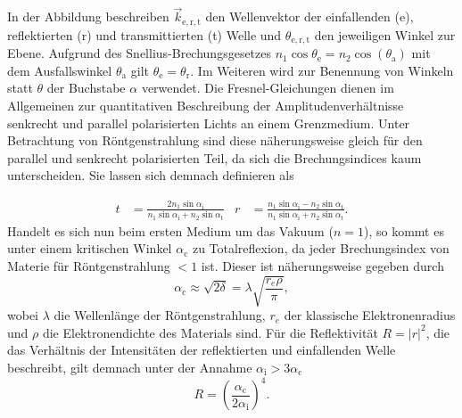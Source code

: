 In der Abbildung beschreiben $\vec{k}_\mathrm{e,r,t}$ den Wellenvektor der einfallenden (e), reflektierten (r) und transmittierten (t) Welle und $\theta_\mathrm{e,r,t}$ den jeweiligen Winkel zur Ebene.
Aufgrund des Snellius-Brechungsgesetzes $n_1 \cos {\theta_\mathrm{e}} = n_2 \cos (\theta_\mathrm{a}) $ mit dem Ausfallswinkel $\theta_\mathrm{a}$ gilt $\theta_\mathrm{e} = \theta_\mathrm{r}$. Im Weiteren wird zur Benennung von Winkeln statt $\theta$ der Buchstabe $\alpha$ verwendet.
Die Fresnel-Gleichungen dienen im Allgemeinen zur quantitativen Beschreibung der Amplitudenverhältnisse senkrecht und parallel polarisierten Lichts an einem Grenzmedium. Unter Betrachtung von Röntgenstrahlung sind diese näherungsweise gleich für den parallel und senkrecht polarisierten Teil, da sich die Brechungsindices kaum unterscheiden. Sie lassen sich demnach definieren als

\begin{align*}
  t &= \frac{2 n_1 \sin \alpha_\mathrm{i}}{n_1 \sin \alpha_\mathrm{i} + n_2 \sin \alpha_\mathrm{t}} &
  r &= \frac{ n_1 \sin \alpha_\mathrm{i} - n_2 \sin \alpha_\mathrm{t}}{n_1 \sin \alpha_\mathrm{i} + n_2 \sin \alpha_\mathrm{t}}.
\end{align*}
Handelt es sich nun beim ersten Medium um das Vakuum ($n=1$), so kommt es unter einem kritischen Winkel $\alpha_\mathrm{c}$ zu Totalreflexion, da jeder Brechungsindex von Materie für Röntgenstrahlung $<1$ ist.
Dieser ist näherungsweise gegeben durch
\begin{equation}
  \alpha_\mathrm{c} \approx \sqrt{2\delta} = \lambda \sqrt{\frac{r_e \rho}{\pi}},
  \label{eqn:nocheine}
\end{equation}
wobei $\lambda$ die Wellenlänge der Röntgenstrahlung, $r_e$ der klassische Elektronenradius und $\rho$ die Elektronendichte des Materials sind.
Für die Reflektivität $R = |r|^2$, die das Verhältnis der Intensitäten der reflektierten und einfallenden Welle beschreibt, gilt demnach unter der Annahme $\alpha_\mathrm{i} > 3 \alpha_\mathrm{c}$
\begin{equation}
  R = \left( \frac{\alpha_\mathrm{c}}{2 \alpha_\mathrm{i}} \right)^4.
  \label{eqn:fresnel}
\end{equation}

